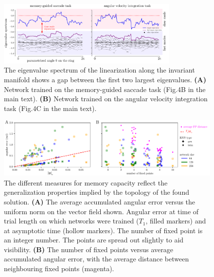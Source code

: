 \documentclass[letterpaper]{article}
\begin{document}
\begin{figure}[tbhp]
  \centering
  \includegraphics[width=0.8\textwidth]{eigenvalue_gap}
  \caption{The eigenvalue spectrum of the linearization along the invariant manifold shows a gap between the first two largest eigenvalues.
    \textbf{(A)} Network trained on the memory-guided saccade task (Fig.4B in the main text).
    \textbf{(B)} Network trained on the angular velocity integration task (Fig.4C in the main text).
}\label{fig:eigenvalue_gap}
\end{figure}




\begin{figure}[tbhp]
  \centering
  \includegraphics[width=.8\textwidth]{angular_losses_lstm_gru}
  \caption{The different measures for memory capacity reflect the generalization properties implied by the topology of the found solution.
    \textbf{(A)} The average accumulated angular error versus the uniform norm on the vector field shown.
     Angular error at time of trial length on which networks were trained (\(T_1\), filled markers) and at asymptotic time (hollow markers).
      The number of fixed point is an integer number. The points are spread out slightly to aid visibility.
    \textbf{(B)}  The number of fixed points versus average accumulated angular error, with the average distance between neighbouring fixed points (magenta).
}\label{fig:angular_losses_lstm_gru}
\end{figure}
\end{document}
